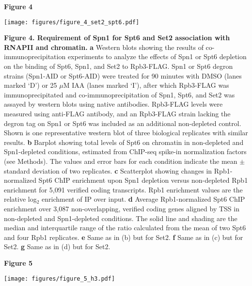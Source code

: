 \documentclass[8pt]{extarticle}
\begin{document}
\newpage

\textbf{\large Figure 4}
\vspace{5.5pt}

\texttt{[image: figures/figure\_4\_set2\_spt6.pdf]}

\vspace{2em}
\textbf{Figure 4. Requirement of Spn1 for Spt6 and Set2 association with RNAPII and chromatin.}
\textbf{a} Western blots showing the results of co-immunoprecipitation experiments to analyze the effects of Spn1 or Spt6 depletion on the binding of Spt6, Spn1, and Set2 to Rpb3-FLAG.
Spn1 or Spt6 degron strains (Spn1-AID or Spt6-AID) were treated for 90 minutes with DMSO (lanes marked `D') or 25 $\mu$M IAA (lanes marked `I'), after which Rpb3-FLAG was immunoprecipitated and co-immunoprecipitation of Spn1, Spt6, and Set2 was assayed by western blots using native antibodies.
Rpb3-FLAG levels were measured using anti-FLAG antibody, and an Rpb3-FLAG strain lacking the degron tag on Spn1 or Spt6 was included as an additional non-depleted control.
Shown is one representative western blot of three biological replicates with similar results.
\textbf{b} Barplot showing total levels of Spt6 on chromatin in non-depleted and Spn1-depleted conditions, estimated from ChIP-seq spike-in normalization factors (see Methods).
The values and error bars for each condition indicate the mean $\pm$ standard deviation of two replicates.
\textbf{c} Scatterplot showing changes in Rpb1-normalized Spt6 ChIP enrichment upon Spn1 depletion versus non-depleted Rpb1 enrichment for 5,091 verified coding transcripts.
Rpb1 enrichment values are the relative log$_2$ enrichment of IP over input.
\textbf{d} Average Rpb1-normalized Spt6 ChIP enrichment over 3,087 non-overlapping, verified coding genes aligned by TSS in non-depleted and Spn1-depleted conditions.
The solid line and shading are the median and interquartile range of the ratio calculated from the mean of two Spt6 and four Rpb1 replicates.
\textbf{e} Same as in (b) but for Set2.
\textbf{f} Same as in (c) but for Set2.
\textbf{g} Same as in (d) but for Set2.

\newpage

\textbf{\large Figure 5}

\texttt{[image: figures/figure\_5\_h3.pdf]}
\end{document}
